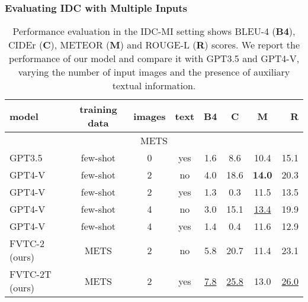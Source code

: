 \documentclass[10pt,twocolumn,letterpaper]{article}
\begin{document}
\subsubsection{Evaluating IDC with Multiple Inputs}

\begin{table}[ht]
\caption{Performance evaluation in the IDC-MI setting shows BLEU-4 (\textbf{B4}), CIDEr (\textbf{C}), METEOR (\textbf{M}) and ROUGE-L (\textbf{R}) scores.
     We report the performance of our model and compare it with GPT3.5 and GPT4-V, varying the number of input images and the presence of auxiliary textual information.}
\label{tab:idc-mi}
\vskip 0.15in
\begin{center}
\begin{small}
\begin{sc}
    \begin{tabular}{lccccccr}
    \toprule
         \textbf{model}&  \textbf{training data}& \textbf{images}& \textbf{text}&  \textbf{B4}&  \textbf{C}&  \textbf{M}& \textbf{R}\\
         \midrule
         \multicolumn{8}{c}{METS}\\
         \midrule
         GPT3.5 \cite{gpt-3}& few-shot & 0 & yes & 1.6 & 8.6 & 10.4 & 15.1\\
         GPT4-V \cite{gpt4}& few-shot & 2 & no & 4.0 & 18.6 & \bf14.0 & 20.3\\
         GPT4-V\cite{gpt4}& few-shot & 2 & yes & 1.3 & 0.3 & 11.5 & 13.5\\
         GPT4-V\cite{gpt4}& few-shot & 4 & no & 3.0 & 15.1 & \underline{13.4} & 19.9\\
         GPT4-V\cite{gpt4}& few-shot & 4 & yes & 1.4 & 0.4 & 11.6 & 12.9\\
         FVTC-2 (ours)& METS & 2 & no & 5.8 & 20.7 & 11.4 & 23.1\\
         FVTC-2T (ours)& METS & 2 & yes & \underline{7.8} & \underline{25.8} & 13.0 & \underline{26.0}\\

\end{tabular}
\end{sc}
\end{small}
\end{center}
\end{table}
\end{document}
